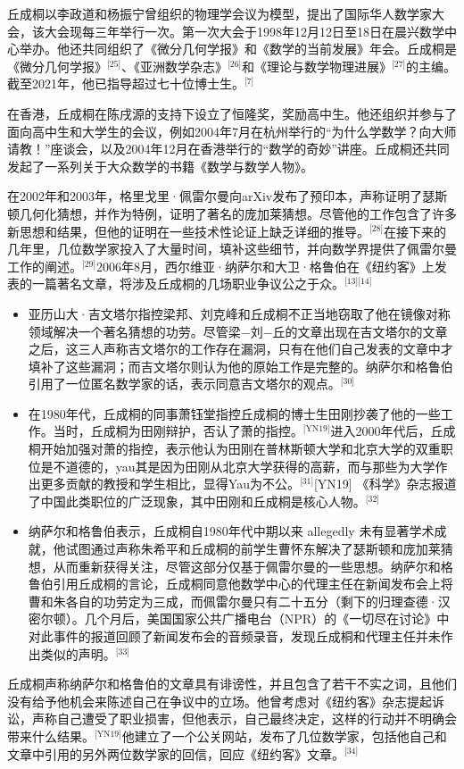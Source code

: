 丘成桐以李政道和杨振宁曾组织的物理学会议为模型，提出了国际华人数学家大会，该大会现每三年举行一次。第一次大会于1998年12月12日至18日在晨兴数学中心举办。他还共同组织了《微分几何学报》和《数学的当前发展》年会。丘成桐是《微分几何学报》\(^\text{[25]}\)、《亚洲数学杂志》\(^\text{[26]}\)和《理论与数学物理进展》\(^\text{[27]}\)的主编。截至2021年，他已指导超过七十位博士生。\(^\text{[7]}\)

在香港，丘成桐在陈戌源的支持下设立了恒隆奖，奖励高中生。他还组织并参与了面向高中生和大学生的会议，例如2004年7月在杭州举行的“为什么学数学？向大师请教！”座谈会，以及2004年12月在香港举行的“数学的奇妙”讲座。丘成桐还共同发起了一系列关于大众数学的书籍《数学与数学人物》。

在2002年和2003年，格里戈里·佩雷尔曼向arXiv发布了预印本，声称证明了瑟斯顿几何化猜想，并作为特例，证明了著名的庞加莱猜想。尽管他的工作包含了许多新思想和结果，但他的证明在一些技术性论证上缺乏详细的推导。\(^\text{[28]}\)在接下来的几年里，几位数学家投入了大量时间，填补这些细节，并向数学界提供了佩雷尔曼工作的阐述。\(^\text{[29]}\)2006年8月，西尔维亚·纳萨尔和大卫·格鲁伯在《纽约客》上发表的一篇著名文章，将涉及丘成桐的几场职业争议公之于众。\(^\text{[13][14]}\)
\begin{itemize}
\item 亚历山大·吉文塔尔指控梁邦、刘克峰和丘成桐不正当地窃取了他在镜像对称领域解决一个著名猜想的功劳。尽管梁−刘−丘的文章出现在吉文塔尔的文章之后，这三人声称吉文塔尔的工作存在漏洞，只有在他们自己发表的文章中才填补了这些漏洞；而吉文塔尔则认为他的原始工作是完整的。纳萨尔和格鲁伯引用了一位匿名数学家的话，表示同意吉文塔尔的观点。\(^\text{[30]}\)
\item 在1980年代，丘成桐的同事萧钰堂指控丘成桐的博士生田刚抄袭了他的一些工作。当时，丘成桐为田刚辩护，否认了萧的指控。\(^\text{[YN19]}\)进入2000年代后，丘成桐开始加强对萧的指控，表示他认为田刚在普林斯顿大学和北京大学的双重职位是不道德的，yau其是因为田刚从北京大学获得的高薪，而与那些为大学作出更多贡献的教授和学生相比，显得Yau为不公。\(^\text{[31]}\)[YN19] 《科学》杂志报道了中国此类职位的广泛现象，其中田刚和丘成桐是核心人物。\(^\text{[32]}\) 
\item 纳萨尔和格鲁伯表示，丘成桐自1980年代中期以来 allegedly 未有显著学术成就，他试图通过声称朱希平和丘成桐的前学生曹怀东解决了瑟斯顿和庞加莱猜想，从而重新获得关注，尽管这部分仅基于佩雷尔曼的一些思想。纳萨尔和格鲁伯引用丘成桐的言论，丘成桐同意他数学中心的代理主任在新闻发布会上将曹和朱各自的功劳定为三成，而佩雷尔曼只有二十五分（剩下的归理查德·汉密尔顿）。几个月后，美国国家公共广播电台（NPR）的《一切尽在讨论》中对此事件的报道回顾了新闻发布会的音频录音，发现丘成桐和代理主任并未作出类似的声明。\(^\text{[33]}\)
\end{itemize}
丘成桐声称纳萨尔和格鲁伯的文章具有诽谤性，并且包含了若干不实之词，且他们没有给予他机会来陈述自己在争议中的立场。他曾考虑对《纽约客》杂志提起诉讼，声称自己遭受了职业损害，但他表示，自己最终决定，这样的行动并不明确会带来什么结果。\(^\text{[YN19]}\)他建立了一个公关网站，发布了几位数学家，包括他自己和文章中引用的另外两位数学家的回信，回应《纽约客》文章。\(^\text{[34]}\)


